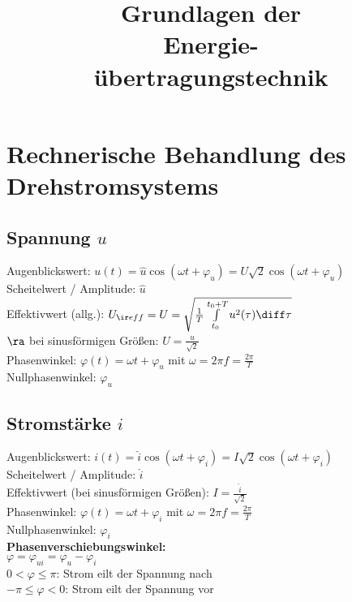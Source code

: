 \documentclass[german]{latex4ei/latex4ei_sheet}
\title{Grundlagen der\\ Energie-\\übertragungstechnik}
\begin{document}
\ifdefined\GitRevision{}\fi

\maketitle

\section{Rechnerische Behandlung des Drehstromsystems}

\begin{sectionbox}
	 \subsection{Spannung $u$}

	 Augenblickswert:
	 $u(t) = \hat u \cos ( \omega t + \varphi_u) = U \sqrt 2 \cos (\omega t + \varphi_u)$ \\

	 Scheitelwert / Amplitude:  $\hat u$ \\

	 Effektivwert (allg.): $U_{\ir eff} = U = \sqrt{\frac{1}{T} \int \limits_{t_0}^{t_0 + T} u^2(\tau) \diff \tau}$ \\
	 $\ra $ bei sinusförmigen Größen: $U = \frac{\hat u}{\sqrt 2}$ \\

	 Phasenwinkel: $\varphi (t) = \omega t + \varphi_u$ mit $\omega = 2 \pi f = \frac{2 \pi}{T}$ \\

	 Nullphasenwinkel: $\varphi_u$ \\
\end{sectionbox}

\begin{sectionbox}
	\subsection{Stromstärke $i$ }
	 Augenblickswert:
	 $i(t) = \hat{i} \cos ( \omega t + \varphi_i) = I \sqrt 2 \cos (\omega t + \varphi_i)$ \\

	 Scheitelwert / Amplitude:  $\hat i$ \\

	 Effektivwert (bei sinusförmigen Größen): $I = \frac{\hat i}{\sqrt 2}$ \\

	 Phasenwinkel: $\varphi (t) = \omega t + \varphi_i$ mit $\omega = 2 \pi f = \frac{2 \pi}{T}$ \\

	 Nullphasenwinkel: $\varphi_i$ \\

	 \textbf{Phasenverschiebungswinkel:} \\
	 $\varphi = \varphi_{ui} = \varphi_u - \varphi_i$ \\

	  $0 < \varphi \le \pi$: Strom eilt der Spannung nach \\
	 $-\pi \le \varphi < 0$: Strom eilt der Spannung vor
\end{sectionbox}
\end{document}
